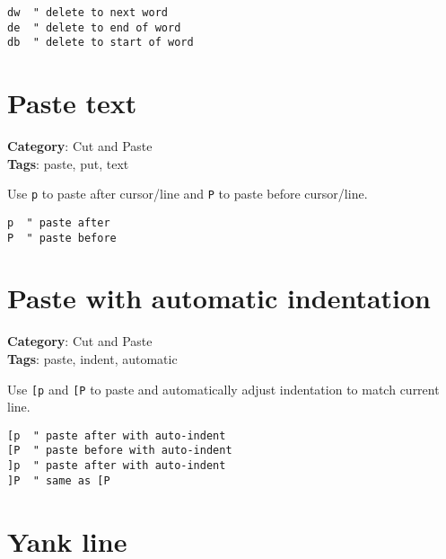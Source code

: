 {{{\begin{Exa*}{}
\begin{Verbatim}[fontsize=\footnotesize, breaklines, breakanywhere]
dw  " delete to next word
de  " delete to end of word
db  " delete to start of word
\end{Verbatim}
\end{Exa*}

\section{Paste text}

\textbf{Category}: Cut and Paste\\ \textbf{Tags}: paste, put, text
\vspace{0.5cm}

Use {\footnotesize \Verb§p§} to paste after cursor/line and {\footnotesize \Verb§P§} to paste before cursor/line.

\begin{Exa*}{}
\begin{Verbatim}[fontsize=\footnotesize, breaklines, breakanywhere]
p  " paste after
P  " paste before
\end{Verbatim}
\end{Exa*}

\section{Paste with automatic indentation}

\textbf{Category}: Cut and Paste\\ \textbf{Tags}: paste, indent, automatic
\vspace{0.5cm}

Use {\footnotesize \Verb§[p§} and {\footnotesize \Verb§[P§} to paste and automatically adjust indentation to match current line.

\begin{Exa*}{}
\begin{Verbatim}[fontsize=\footnotesize, breaklines, breakanywhere]
[p  " paste after with auto-indent
[P  " paste before with auto-indent  
]p  " paste after with auto-indent
]P  " same as [P
\end{Verbatim}
\end{Exa*}

\section{Yank line}

}}}

